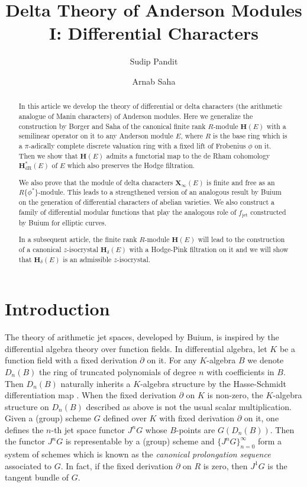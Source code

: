 \documentclass{amsart}
\title
[Delta Theory of Anderson Modules I: Differential Characters]
{Delta Theory of Anderson Modules I: Differential Characters}
\author{Sudip Pandit}
\author{Arnab Saha}
\date{}
\date{}
\numberwithin {equation}{section}
\begin{document}
\begin{abstract}
In this article we develop the theory of differential or delta characters (the 
arithmetic analogue of Manin characters) of Anderson modules. 
Here we generalize the construction by Borger and Saha of the canonical 
finite rank $R$-module $\mathbf{H}(E)$ with a semilinear operator on it
 to any Anderson module $E$,
where $R$ is the base ring which is a $\pi$-adically complete discrete valuation ring with a fixed lift of Frobenius $\phi$ on it. 
Then we show that $\mathbf{H}(E)$ admits a functorial map to the de Rham 
cohomology $\mathbf{H}_{\mathrm{dR}}^*(E)$ of $E$ which also preserves the
Hodge filtration. 

We also prove that the module of delta characters 
$\mathbf{X}_{\infty}(E)$ is  finite and free as an $R\{\phi^{*}\}$-module. 
This leads to a strengthened version of an analogous result by Buium on the generation of differential characters of abelian varieties. 
We also construct a family of differential modular functions that play the 
analogous role of $f_{\mathrm{jet}}$ constructed by Buium for elliptic curves.

In a subsequent article, the finite rank $R$-module $\mathbf{H}(E)$ will lead to 
the construction of a canonical $z$-isocrystal $\mathbf{H}_{\delta}(E)$ with a Hodge-Pink
filtration on it and we will show that $\mathbf{H}_{\delta}(E)$ is an admissible
$z$-isocrystal. 
\end{abstract}

\maketitle
\section{Introduction}

 The theory of arithmetic jet spaces, developed by Buium, is inspired by 
the differential algebra theory over function fields. In differential algebra,
let $K$ be a function field
with a fixed derivation $\partial$ on it. For any $K$-algebra $B$ we denote 
${D}_n(B)$ the ring of truncated polynomials of degree $n$ with 
coefficients in $B$. Then ${D}_n(B)$ naturally inherits a $K$-algebra 
structure by the Hasse-Schmidt differentiation map \cite{gil02}. 
When the fixed derivation $\partial$
on $K$ is non-zero, the $K$-algebra structure on ${D}_n(B)$ described 
as above is not the usual scalar multiplication.
Given a (group) scheme $G$ defined over $K$ with fixed 
derivation $\partial$ on it, one defines the $n$-th jet space functor $J^nG$ 
whose
$B$-points are $G({D}_n(B))$. Then the functor 
$J^nG$ is representable by a (group)
scheme and $\{J^nG\}_{n=0}^\infty$ form a system of schemes which is known
as the {\it canonical prolongation sequence} associated to $G$. In fact, if the
fixed derivation $\partial$ on $R$ is zero, then $J^1G$ is the tangent 
bundle of $G$.
\end{document}

